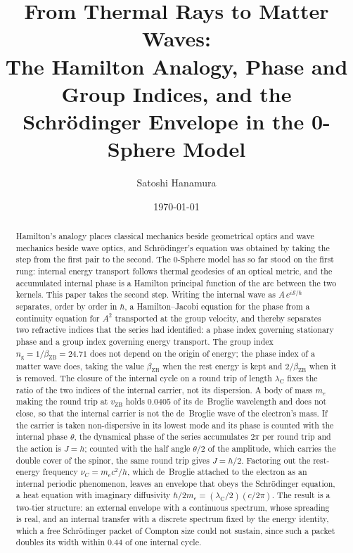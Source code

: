 \documentclass[%
 reprint, amsmath,amssymb, aps, prb, ]{revtex4-2}
\numberwithin{equation}{section}
\newcommand{\lambdaC}{\lambda_{\mathrm{C}}}
\newcommand{\bZB}{\beta_{\mathrm{ZB}}}
\newcommand{\ngr}{n_{\mathrm{g}}}
\begin{document}
\title{From Thermal Rays to Matter Waves:\\The Hamilton Analogy, Phase and Group Indices, and the Schr\"odinger Envelope in the 0-Sphere Model}

\author{Satoshi Hanamura}

\date{\today}

\begin{abstract}
Hamilton's analogy places classical mechanics beside geometrical optics and wave mechanics beside wave optics, and Schr\"odinger's equation was obtained by taking the step from the first pair to the second.
The 0-Sphere model has so far stood on the first rung: internal energy transport follows thermal geodesics of an optical metric, and the accumulated internal phase is a Hamilton principal function of the arc between the two kernels.
This paper takes the second step.
Writing the internal wave as $A\,e^{i\mathcal{S}/\hbar}$ separates, order by order in $\hbar$, a Hamilton--Jacobi equation for the phase from a continuity equation for $A^2$ transported at the group velocity, and thereby separates two refractive indices that the series had identified: a phase index governing stationary phase and a group index governing energy transport.
The group index $\ngr = 1/\bZB = 24.71$ does not depend on the origin of energy; the phase index of a matter wave does, taking the value $\bZB$ when the rest energy is kept and $2/\bZB$ when it is removed.
The closure of the internal cycle on a round trip of length $\lambdaC$ fixes the ratio of the two indices of the internal carrier, not its dispersion. A body of mass $m_e$ making the round trip at $v_{\mathrm{ZB}}$ holds $0.0405$ of its de~Broglie wavelength and does not close, so that the internal carrier is not the de~Broglie wave of the electron's mass. If the carrier is taken non-dispersive in its lowest mode and its phase is counted with the internal phase $\theta$, the dynamical phase of the series accumulates $2\pi$ per round trip and the action is $J = h$; counted with the half angle $\theta/2$ of the amplitude, which carries the double cover of the spinor, the same round trip gives $J = h/2$.
Factoring out the rest-energy frequency $\nu_C = m_ec^2/h$, which de~Broglie attached to the electron as an internal periodic phenomenon, leaves an envelope that obeys the Schr\"odinger equation, a heat equation with imaginary diffusivity $\hbar/2m_e = (\lambdaC/2)(c/2\pi)$.
The result is a two-tier structure: an external envelope with a continuous spectrum, whose spreading is real, and an internal transfer with a discrete spectrum fixed by the energy identity, which a free Schr\"odinger packet of Compton size could not sustain, since such a packet doubles its width within $0.44$ of one internal cycle.

\end{abstract}
\end{document}
